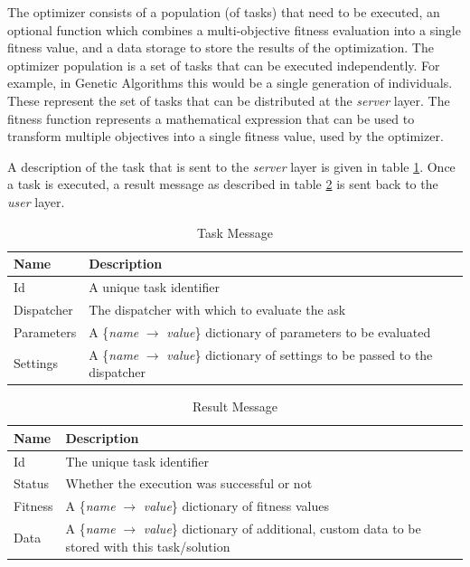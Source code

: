 \documentclass{report}
\begin{document}
The optimizer consists of a population (of tasks) that need to
be executed, an optional function which combines a multi-objective fitness evaluation
into a single fitness value, and a data storage to store the results of the
optimization. The optimizer population is a set of tasks that can be executed
independently. For example, in Genetic Algorithms this would be a single
generation of individuals. These represent the set of tasks that can be
distributed at the \textit{server} layer. The fitness function represents
a mathematical expression that can be used to transform multiple objectives
into a single fitness value, used by the optimizer.

A description of the task that is sent to the \textit{server} layer
is given in table \ref{tab:task_message}. Once a task is executed, a result
message as described in table \ref{tab:result_message} is sent back to
the \textit{user} layer.

\begin{table}[h!tb]\caption{Task Message}\label{tab:task_message}\vspace{0.1in}
	\centering

	\begin{tabular}{p{3cm} p{10cm}}
		\toprule
		\textbf{Name} & \textbf{Description} \\
		\midrule
		Id & A unique task identifier \\
		Dispatcher & The dispatcher with which to evaluate the ask \\
		Parameters & A \{\textit{name} $\rightarrow$ \textit{value}\} dictionary of
			         parameters to be evaluated \\
		Settings & A \{\textit{name} $\rightarrow$ \textit{value}\} dictionary of
			       settings to be passed to the dispatcher \\
		\bottomrule
	\end{tabular}
\end{table}

\begin{table}[h!tb]\caption{Result Message}\label{tab:result_message}\vspace{0.1in}
	\centering

	\begin{tabular}{p{3cm} p{10cm}}
		\toprule
		\textbf{Name} & \textbf{Description} \\
		\midrule
		Id & The unique task identifier \\
		Status & Whether the execution was successful or not \\
		Fitness & A \{\textit{name} $\rightarrow$ \textit{value}\} dictionary
		          of fitness values \\
		Data & A \{\textit{name} $\rightarrow$ \textit{value}\} dictionary
		          of additional, custom data to be stored with this task/solution \\
		\bottomrule
	\end{tabular}
\end{table}
\end{document}
